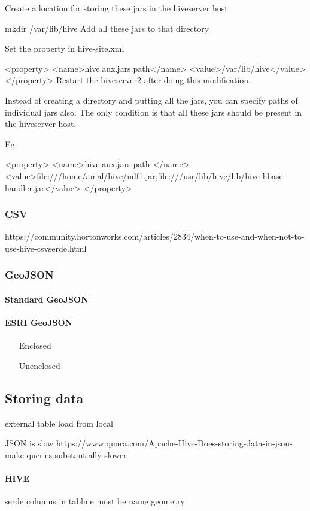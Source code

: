 \documentclass[a4paper,12pt,oneside]{report}
\begin{document}
Create a location for storing these jars in the hiveserver host.

mkdir /var/lib/hive
Add all these jars to that directory

Set the property in hive-site.xml

<property>
  <name>hive.aux.jars.path</name>
  <value>/var/lib/hive</value>
</property>
Restart the hiveserver2 after doing this modification.

Instead of creating a directory and putting all the jars, you can specify paths of individual jars also. The only condition is that all these jars should be present in the hiveserver host.

Eg:

<property>
  <name>hive.aux.jars.path </name>
  <value>file:///home/amal/hive/udf1.jar,file:///usr/lib/hive/lib/hive-hbase-handler.jar</value>
</property>
	
		\subsubsection{CSV}
		
		https://community.hortonworks.com/articles/2834/when-to-use-and-when-not-to-use-hive-csvserde.html
		\subsubsection{GeoJSON}\label{json}	
			\paragraph{Standard GeoJSON}	
			\paragraph{ESRI GeoJSON}
				\begin{enumerate}
					\item[Enclosed]
					\item[Unenclosed]
				\end{enumerate}
	
	
	\subsection{Storing data}
	external table
	load from local

	 JSON is slow 
	https://www.quora.com/Apache-Hive-Does-storing-data-in-json-make-queries-substantially-slower
	
	\paragraph{HIVE}
		serde
	columns in tablme must be name geometry
	
\end{document}
